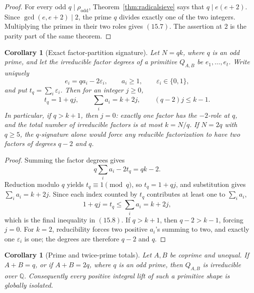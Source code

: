 \documentclass[11pt]{article}
\newtheorem{corollary}[theorem]{Corollary}
\theoremstyle{definition}
\newcommand{\Q}{\mathbb Q}
\begin{document}
\begin{proof}
For every odd \(q\mid\rho_{\mathrm{odd}}\),
Theorem~\ref{thm:radicalsieve} says that \(q\mid e(e+2)\).  Since
\(\gcd(e,e+2)\mid2\), the prime \(q\) divides exactly one of the two
integers.  Multiplying the primes in their two roles gives \((15.7)\).  The
assertion at \(2\) is the parity part of the same theorem.
\end{proof}

\begin{corollary}[Exact factor-partition signature]
\label{cor:partitionsignature}
Let \(N=qk\), where \(q\) is an odd prime, and let the irreducible factor
degrees of a primitive \(Q_{A,B}\) be \(e_1,\ldots,e_t\).  Write uniquely
\[
 e_i=qa_i-2\varepsilon_i,
 \qquad a_i\geq1,
 \qquad \varepsilon_i\in\{0,1\},
\]
and put \(t_q=\sum_i\varepsilon_i\).  Then for an integer \(j\geq0\),
\begin{equation}
 t_q=1+qj,
 \qquad
 \sum_i a_i=k+2j,
 \qquad
 (q-2)j\leq k-1.
 \tag{15.8}
\end{equation}
In particular, if \(q>k+1\), then \(j=0\): exactly one factor has the
\(-2\)-role at \(q\), and the total number of irreducible factors is at
most \(k=N/q\).  If \(N=2q\) with \(q\geq5\), the \(q\)-signature
alone would force any reducible factorization to have two factors of degrees
\(q-2\) and \(q\).
\end{corollary}

\begin{proof}
Summing the factor degrees gives
\[
 q\sum_i a_i-2t_q=qk-2.
\]
Reduction modulo \(q\) yields \(t_q\equiv1\pmod q\), so
\(t_q=1+qj\), and substitution gives \(\sum_i a_i=k+2j\).  Since each
index counted by \(t_q\) contributes at least one to \(\sum_i a_i\),
\[
 1+qj=t_q\leq\sum_i a_i=k+2j,
\]
which is the final inequality in \((15.8)\).  If \(q>k+1\), then
\(q-2>k-1\), forcing \(j=0\).  For \(k=2\), reducibility forces two
positive \(a_i\)'s summing to two, and exactly one \(\varepsilon_i\) is
one; the degrees are therefore \(q-2\) and \(q\).
\end{proof}

\begin{corollary}[Prime and twice-prime totals]
\label{cor:prime-totals}
Let \(A,B\) be coprime and unequal.  If \(A+B=q\), or if
\(A+B=2q\), where \(q\) is an odd prime, then \(Q_{A,B}\) is
irreducible over \(\Q\).  Consequently every positive integral lift of
such a primitive shape is globally isolated.
\end{corollary}
\end{document}
